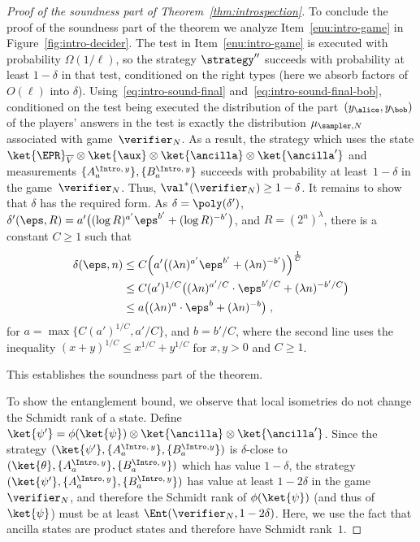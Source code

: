 \begin{proof}[Proof of the soundness part of Theorem~\ref{thm:introspection}]
	To conclude the proof of the soundness part of the theorem we analyze
  Item~\ref{enu:intro-game} in Figure~\ref{fig:intro-decider}.
  The test in Item~\ref{enu:intro-game} is executed with probability
  $\Omega(1/\ell)$, so the strategy $\strategy''$ succeeds with probability at
  least $1 - \delta$ in that test, conditioned on the right types (here we
  absorb factors of $O(\ell)$ into $\delta$).
  Using~\eqref{eq:intro-sound-final} and~\eqref{eq:intro-sound-final-bob},
  conditioned on the test being executed the distribution of the
  part~$(y_\alice, y_\bob)$ of the players' answers in the test is exactly the
  distribution $\mu_{\sampler, N}$ associated with game~$\verifier_N$.
  As a result, the strategy which uses the state $\ket{\EPR}_{\overline{V}}
  \otimes \ket{\aux} \otimes \ket{\ancilla} \otimes \ket{\ancilla'}$ and
  measurements $ \{ A^{\Intro,\, y}_a \},\{ B^{\Intro,\, y}_a \}$ succeeds with
  probability at least~$1- \delta$ in the game~$\verifier_N$.
  Thus, $\val^*(\verifier_N) \geq 1- \delta$.
  It remains to show that $\delta$ has the required form. 
  As $\delta = \poly(\delta')$, $\delta'(\eps, R) = a' \bigl( (\log
  R)^{a'}\eps^{b'} + (\log R)^{-b'} \bigr)$, and $R = (2^n)^\lambda$, there is a
  constant $C \ge 1$ such that
  \begin{equation*}
    \begin{split}
      \delta(\eps, n) & \le C \Bigl( a' \bigl( (\lambda n)^{a'} \eps^{b'} +
      (\lambda n)^{-b'} \bigr) \Bigr)^{\frac{1}{C}}\\
      & \le C (a')^{1/C} \bigl(  (\lambda n)^{a'/C} \cdot \eps^{b'/C} + (\lambda n)^{-b'/C} \bigr)\\
      & \le a \bigl( (\lambda n)^a \cdot \eps^b + (\lambda n)^{-b} \bigr)\;,
    \end{split}
  \end{equation*}
  for $a = \max \bigl\{ C (a')^{1/C}, a'/C \bigr\}$, and $b = b'/C$, where the
  second line uses the inequality $(x+y)^{1/C} \le x^{1/C} + y^{1/C}$ for
  $x,y>0$ and $C\ge 1$. 
  
  
  This establishes the soundness part of the theorem.

  To show the entanglement bound, we observe that local isometries do not change
  the Schmidt rank of a state.
  Define $\ket{\psi'} = \phi(\ket{\psi}) \otimes \ket{\ancilla} \otimes
  \ket{\ancilla'}$.
  Since the strategy $(\ket{\psi'}, \{ A^{\Intro,\, y}_a \},\{ B^{\Intro, y}_a
  \})$ is $\delta$-close to $(\ket{\theta}, \{ A^{\Intro,\, y}_a \},\{
  B^{\Intro,\, y}_a \})$ which has value $1 - \delta$, the strategy
  $(\ket{\psi'}, \{ A^{\Intro,\, y}_a \},\{ B^{\Intro,\, y}_a \})$ has value at
  least $1 - 2\delta$ in the game $\verifier_N$, and therefore the Schmidt rank
  of $\phi(\ket{\psi})$ (and thus of $\ket{\psi}$) must be at least
  $\Ent(\verifier_N,1 - 2\delta)$.
  Here, we use the fact that ancilla states are product states and therefore
  have Schmidt rank~$1$.
  

\end{proof}
